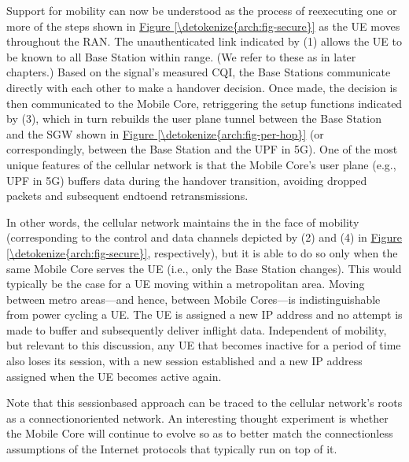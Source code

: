 \documentclass[a4paper,11pt,english]{sphinxmanual}
\begin{document}
\sphinxAtStartPar
Support for mobility can now be understood as the process of
re\sphinxhyphen{}executing one or more of the steps shown in \hyperref[\detokenize{arch:fig-secure}]{Figure \ref{\detokenize{arch:fig-secure}}} as the UE moves throughout the RAN.  The unauthenticated
link indicated by (1) allows the UE to be known to all Base Station
within range. (We refer to these as  in later
chapters.) Based on the signal’s measured CQI, the Base Stations
communicate directly with each other to make a handover decision. Once
made, the decision is then communicated to the Mobile Core,
re\sphinxhyphen{}triggering the setup functions indicated by (3), which in turn
re\sphinxhyphen{}builds the user plane tunnel between the Base Station and the SGW
shown in \hyperref[\detokenize{arch:fig-per-hop}]{Figure \ref{\detokenize{arch:fig-per-hop}}} (or correspondingly,
between the Base Station and the UPF in 5G). One of the most unique
features of the cellular network is that the Mobile Core’s user plane
(e.g., UPF in 5G) buffers data during the handover transition,
avoiding dropped packets and subsequent end\sphinxhyphen{}to\sphinxhyphen{}end retransmissions.

\sphinxAtStartPar
In other words, the cellular network maintains the  in the
face of mobility (corresponding to the control and data channels
depicted by (2) and (4) in \hyperref[\detokenize{arch:fig-secure}]{Figure \ref{\detokenize{arch:fig-secure}}},
respectively), but it is able to do so only when the same Mobile Core
serves the UE (i.e., only the Base Station changes).  This would
typically be the case for a UE moving within a metropolitan area.
Moving between metro areas—and hence, between Mobile Cores—is
indistinguishable from power cycling a UE. The UE is assigned a new IP
address and no attempt is made to buffer and subsequently deliver
in\sphinxhyphen{}flight data. Independent of mobility, but relevant to this
discussion, any UE that becomes inactive for a period of time also
loses its session, with a new session established and a new IP address
assigned when the UE becomes active again.

\sphinxAtStartPar
Note that this session\sphinxhyphen{}based approach can be traced to the cellular
network’s roots as a connection\sphinxhyphen{}oriented network. An interesting
thought experiment is whether the Mobile Core will continue to evolve
so as to better match the connectionless assumptions of the Internet
protocols that typically run on top of it.
\end{document}
